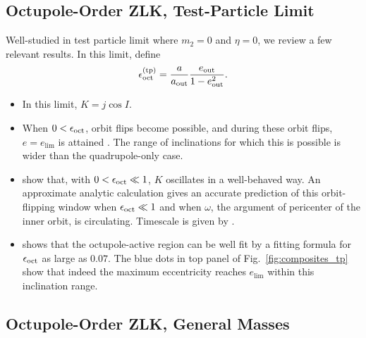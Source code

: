 \documentclass[
        fleqn,
        usenatbib,
    ]{mnras}
\begin{document}
\subsection{Octupole-Order ZLK, Test-Particle Limit}

Well-studied in test particle limit where $m_2 = 0$ and $\eta = 0$, we review a
few relevant results. In this limit, define
\begin{equation}
    \epsilon_{\rm oct}^{\rm (tp)} = \frac{a}{a_{\rm
        out}} \frac{e_{\rm out}}{1 - e_{\rm out}^2}.\label{eq:eps_oct_tp}
\end{equation}

\begin{itemize}
    \item In this limit, $K = j \cos I$.

    \item When $0 < \epsilon_{\rm oct}$, orbit flips become possible, and
        during these orbit flips, $e = e_{\lim}$ is attained
        \citep{lithwick2011eccentric, LML15}. The range of inclinations for
        which this is possible is wider than the quadrupole-only case.

    \item \citet{katz2011long} show that, with $0 < \epsilon_{\rm oct} \ll 1$,
        $K$ oscillates in a well-behaved way. An approximate analytic
        calculation gives an accurate prediction of this orbit-flipping window
        when $\epsilon_{\rm oct} \ll 1$ and when $\omega$, the argument of
        pericenter of the inner orbit, is circulating. Timescale is given by
        \citet{antognini2015timescales}.

    \item \citep{MLL16} shows that the octupole-active region can be well fit by
        a fitting formula for $\epsilon_{\rm oct}$ as large as $0.07$. The
        blue dots in top panel of Fig.~\ref{fig:composites_tp} show that indeed
        the maximum eccentricity reaches $e_{\lim}$ within this inclination
        range.
\end{itemize}

\subsection{Octupole-Order ZLK, General Masses}
\end{document}
